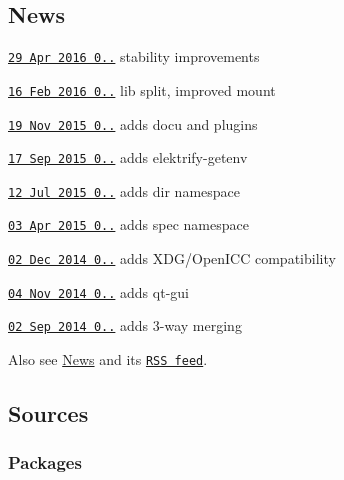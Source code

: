 \subsection*{News}


\begin{DoxyItemize}
\item \href{http://doc.libelektra.org/news/9c9247ee-ee9c-4f4a-a68e-76959def9b82.html}{\tt 29 Apr 2016 0..} stability improvements
\item \href{http://doc.libelektra.org/news/1ab4a560-c286-46d2-a058-1a8e7e208fe8.html}{\tt 16 Feb 2016 0..} lib split, improved mount
\item \href{http://doc.libelektra.org/news/519cbfac-6db5-4594-8a38-dec4c84b134f.html}{\tt 19 Nov 2015 0..} adds docu and plugins
\item \href{http://doc.libelektra.org/news/3c00a5f1-c017-4555-92b5-a2cf6e0803e3.html}{\tt 17 Sep 2015 0..} adds elektrify-\/getenv
\item \href{http://doc.libelektra.org/news/98770541-32a1-486a-98a1-d02f26afc81a.html}{\tt 12 Jul 2015 0..} adds dir namespace
\item \href{http://doc.libelektra.org/news/7d4647d4-4131-411e-9c2a-2aca39446e18.html}{\tt 03 Apr 2015 0..} adds spec namespace
\item \href{http://doc.libelektra.org/news/6ce57ecf-420a-4a31-821e-1c5fe5532eb4.html}{\tt 02 Dec 2014 0..} adds X\+D\+G/\+Open\+I\+C\+C compatibility
\item \href{http://doc.libelektra.org/news/38640673-3e07-4cff-9647-f6bdd89b1b08.html}{\tt 04 Nov 2014 0..} adds qt-\/gui
\item \href{http://doc.libelektra.org/news/eca69e19-5ddb-438c-ac06-57c20b1a9160.html}{\tt 02 Sep 2014 0..} adds 3-\/way merging
\end{DoxyItemize}

Also see \hyperlink{doc_NEWS_md}{News} and its \href{http://www.libelektra.org/news/feed.rss}{\tt R\+S\+S feed}.

\subsection*{Sources}

\subsubsection*{Packages}

